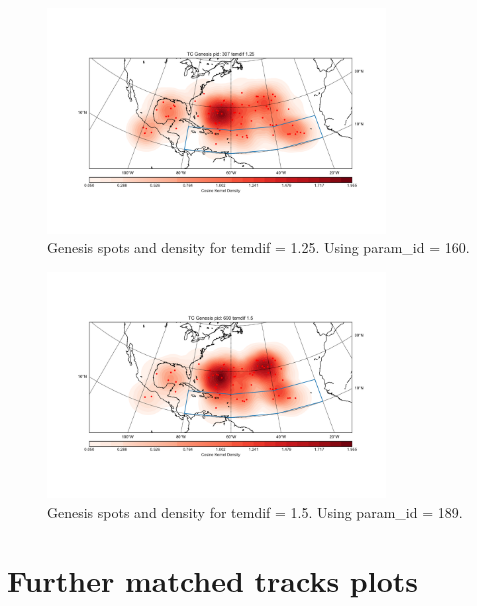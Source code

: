 \begin{figure}[ht]
	\centering
	\includegraphics[width=0.8\textwidth]{img/genesis_plot_temdif125.pdf}
	\caption{Genesis spots and density for temdif = 1.25. Using param\_id = 160.}
\end{figure}
\begin{figure}[ht]
	\centering
	\includegraphics[width=0.8\textwidth]{img/genesis_plot_temdif15.pdf}
	\caption{Genesis spots and density for temdif = 1.5. Using param\_id = 189.}
\end{figure}


\chapter{Further matched tracks plots}\label{sec:matching-appendix}

